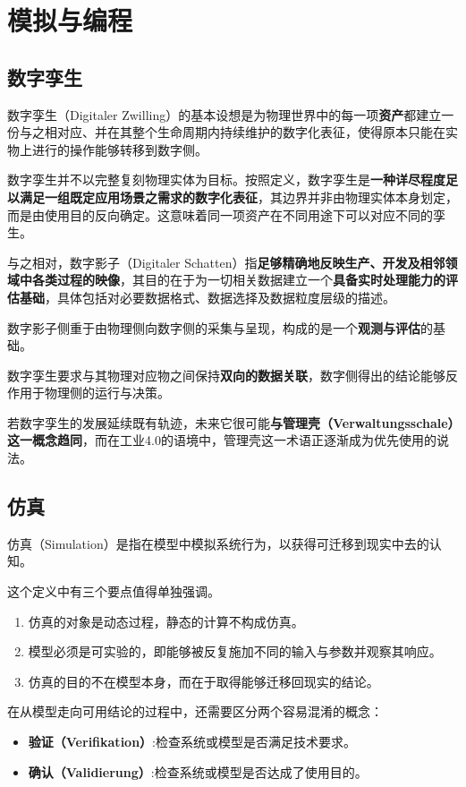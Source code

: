 \section{模拟与编程}

\subsection{数字孪生}

数字孪生（Digitaler Zwilling）的基本设想是为物理世界中的每一项\textbf{资产}都建立一份与之相对应、并在其整个生命周期内持续维护的数字化表征，使得原本只能在实物上进行的操作能够转移到数字侧。

数字孪生并不以完整复刻物理实体为目标。按照定义，数字孪生是\textbf{一种详尽程度足以满足一组既定应用场景之需求的数字化表征}，其边界并非由物理实体本身划定，而是由使用目的反向确定。这意味着同一项资产在不同用途下可以对应不同的孪生。

与之相对，数字影子（Digitaler Schatten）指\textbf{足够精确地反映生产、开发及相邻领域中各类过程的映像}，其目的在于为一切相关数据建立一个\textbf{具备实时处理能力的评估基础}，具体包括对必要数据格式、数据选择及数据粒度层级的描述。

数字影子侧重于由物理侧向数字侧的采集与呈现，构成的是一个\textbf{观测与评估}的基础。

数字孪生要求与其物理对应物之间保持\textbf{双向的数据关联}，数字侧得出的结论能够反作用于物理侧的运行与决策。

若数字孪生的发展延续既有轨迹，未来它很可能\textbf{与管理壳（Verwaltungsschale）这一概念趋同}，而在工业4.0的语境中，管理壳这一术语正逐渐成为优先使用的说法。

\subsection{仿真}

仿真（Simulation）是指在模型中模拟系统行为，以获得可迁移到现实中去的认知。

这个定义中有三个要点值得单独强调。
\begin{enumerate}
  \item 仿真的对象是动态过程，静态的计算不构成仿真。
  \item 模型必须是可实验的，即能够被反复施加不同的输入与参数并观察其响应。
  \item 仿真的目的不在模型本身，而在于取得能够迁移回现实的结论。
\end{enumerate}

在从模型走向可用结论的过程中，还需要区分两个容易混淆的概念：
\begin{itemize}
  \item \textbf{验证（Verifikation）}:检查系统或模型是否满足技术要求。
  \item \textbf{确认（Validierung）}:检查系统或模型是否达成了使用目的。
\end{itemize}

